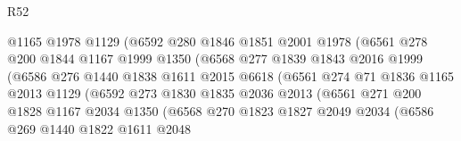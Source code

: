 \begin{lexlean}{R52}
\begin{coremodule}
                            @1165
                            @1978
                            @1129
                            (@6592
                              @280
                              @1846
                              @1851
                              @2001
                              @1978
                              (@6561
                                @278
                                @200
                                @1844
                                @1167
                                @1999
                                @1350
                                (@6568
                                  @277
                                  @1839
                                  @1843
                                  @2016
                                  @1999
                                  (@6586
                                    @276
                                    @1440
                                    @1838
                                    @1611
                                    @2015
                                    @6618
                                    (@6561
                                      @274
                                      @71
                                      @1836
                                      @1165
                                      @2013
                                      @1129
                                      (@6592
                                        @273
                                        @1830
                                        @1835
                                        @2036
                                        @2013
                                        (@6561
                                          @271
                                          @200
                                          @1828
                                          @1167
                                          @2034
                                          @1350
                                          (@6568
                                            @270
                                            @1823
                                            @1827
                                            @2049
                                            @2034
                                            (@6586
                                              @269
                                              @1440
                                              @1822
                                              @1611
                                              @2048

\end{coremodule}
\end{lexlean}

